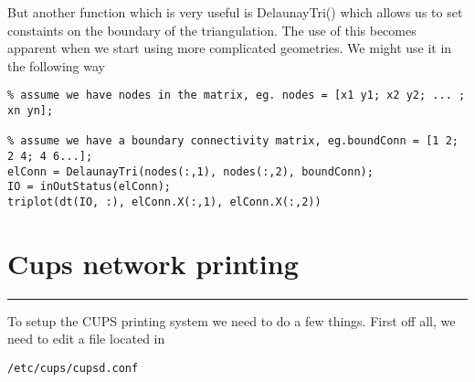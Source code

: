 \documentclass[a4paper, 10pt]{article}
\newcommand{\mytoprule}{\hrule\vspace{4mm}}
\begin{document}
But another function which is very useful is DelaunayTri() which allows us to set constaints on the boundary of the triangulation. The use of this becomes apparent when we start using more complicated geometries. We might use it in the following way
\begin{verbatim}
% assume we have nodes in the matrix, eg. nodes = [x1 y1; x2 y2; ... ; xn yn];

% assume we have a boundary connectivity matrix, eg.boundConn = [1 2; 2 4; 4 6...];
elConn = DelaunayTri(nodes(:,1), nodes(:,2), boundConn);
IO = inOutStatus(elConn);
triplot(dt(IO, :), elConn.X(:,1), elConn.X(:,2))
\end{verbatim}

\vspace{10mm}
\section*{Cups network printing}
\mytoprule

To setup the CUPS printing system we need to do a few things. First off all, we need to edit a file located in 
\begin{verbatim}
/etc/cups/cupsd.conf
\end{verbatim}
\end{document}
